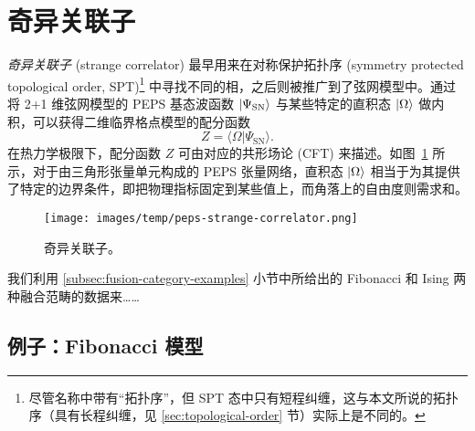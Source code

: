 \section{奇异关联子}
\label{sec:strange-correlator}

\emph{奇异关联子} (strange correlator) 最早用来在对称保护拓扑序 (symmetry protected topological order, SPT)\footnote{尽管名称中带有“拓扑序”，但 SPT 态中只有短程纠缠，这与本文所说的拓扑序（具有长程纠缠，见 \ref{sec:topological-order} 节）实际上是不同的。} 中寻找不同的相\cite{you2014wave}，之后则被推广到了弦网模型中\cite{vanhove2018mapping,lootens2019cardy,vanhove2022topological}。通过将 2+1 维弦网模型的 PEPS 基态波函数 $\ket{\Psi_\text{SN}}$ 与某些特定的直积态 $\ket{\Omega}$ 做内积，可以获得二维临界格点模型的配分函数
\begin{equation}
  Z = \langle\Omega|\Psi_\text{SN}\rangle.
\end{equation}
在热力学极限下，配分函数 $Z$ 可由对应的共形场论 (CFT) 来描述。如图~\ref{fig:peps-strange-correlator} 所示，对于由三角形张量单元构成的 PEPS 张量网络，直积态 $\ket{\Omega}$ 相当于为其提供了特定的边界条件，即把物理指标固定到某些值上，而角落上的自由度则需求和。

\begin{figure}[htb]
  \centering
  \texttt{[image: images/temp/peps-strange-correlator.png]}
  \caption[奇异关联子]{奇异关联子。}
  \label{fig:peps-strange-correlator}
\end{figure}

我们利用 \ref{subsec:fusion-category-examples} 小节中所给出的 Fibonacci 和 Ising 两种融合范畴的数据来……

\subsection{例子：Fibonacci 模型}
\label{subsec:strange-correlator-fib}

